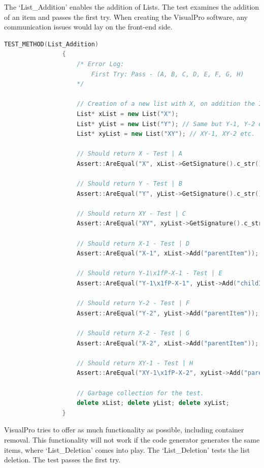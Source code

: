 \documentclass[12pt]{report} %
\begin{document}
            The `List\_Addition' enables the addition of Lists. The test examines the addition of an item and passes the first try. When creating the VisualPro software, any communication issues would lay on the front-end side.

			\begin{lstlisting}[language=c++]
				TEST_METHOD(List_Addition)
				{
					/* Error Log:
						First Try: Pass - (A, B, C, D, E, F, G, H)
					*/

					// Creation of a new list with X, on addition the ID's should follow as X-1, X-2 etc.
					List* xList = new List("X");
					List* yList = new List("Y"); // Same but Y-1, Y-2 etc.
					List* xyList = new List("XY"); // XY-1, XY-2 etc.

					// Should return X - Test | A
					Assert::AreEqual("X", xList->GetSignature().c_str());

					// Should return Y - Test | B
					Assert::AreEqual("Y", yList->GetSignature().c_str());

					// Should return XY - Test | C
					Assert::AreEqual("XY", xyList->GetSignature().c_str());

					// Should return X-1 - Test | D
					Assert::AreEqual("X-1", xList->Add("parentItem"));

					// Should return Y-1\x1fP-X-1 - Test | E
					Assert::AreEqual("Y-1\x1fP-X-1", yList->Add("childItem", "X-1"));

					// Should return Y-2 - Test | F
					Assert::AreEqual("Y-2", yList->Add("parentItem"));

					// Should return X-2 - Test | G
					Assert::AreEqual("X-2", xList->Add("parentItem"));

					// Should return XY-1 - Test | H
					Assert::AreEqual("XY-1\x1fP-X-2", xyList->Add("parentItem", "X-2"));

					// Garbage collection for the test.
					delete xList; delete yList; delete xyList;
				}
			\end{lstlisting}

			VisualPro tries to offer as much functionality as possible, including container removal. This functionality will not work if the code generator generates the same items, where `List\_Deletion' comes into play. The `List\_Deletion' tests the list deletion. The test passes the first try.
\end{document}
